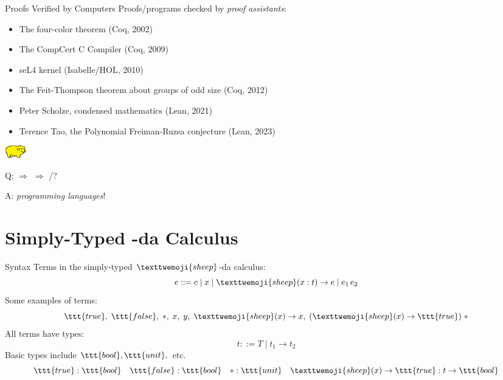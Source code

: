 \documentclass{beamer}
\newcommand{\lamb}{\texttwemoji{sheep}}
\begin{document}
\begin{frame}{Proofs Verified by Computers}
 \small{Proofs/programs checked by \emph{proof assistants}:}
 \pause
 \begin{itemize}
   \item The four-color theorem (Coq, 2002) 
   \item The CompCert C Compiler (Coq, 2009)
   \item seL4 kernel (Isabelle/HOL, 2010)
   \item The Feit-Thompson theorem about groups of odd
     size (Coq, 2012) \pause 
   \item Peter Scholze, condensed mathematics (Lean, 2021)
   \item Terence Tao, the Polynomial Freiman-Ruzsa conjecture (Lean, 2023)
 \end{itemize}
\end{frame}

\begin{frame}{\includegraphics[width=26pt]{yellowPig.png}}
  \begin{center}
    \Huge{Q:  $\Rightarrow$  $\Rightarrow$ /?}
\pause 
\vspace{1em}

    \huge{A: \emph{programming
    languages}!}
  \end{center}
\end{frame}


\section{Simply-Typed \texorpdfstring{\lamb}{lamb}-da Calculus}

\begin{frame}{Syntax}
Terms in the simply-typed $\lamb$-da calculus:
\[
  e ::= c \mid x \mid \lamb(x:t) \to e \mid e_1 \, e_2 
\] 
Some examples of terms: 
\[
  \ttt{true},\; \ttt{false},\; *, \; x,\; y,\; \lamb(x) \to x, \; (\lamb(x) \to
  \ttt{true}) \; *
\]
\pause
All terms have types:
\[
  t ::= T \mid t_1 \to t_2
\]
Basic types include $\ttt{bool}, \ttt{unit},$ etc. 
\[
  \ttt{true} : \ttt{bool} \quad \ttt{false} : \ttt{bool} \quad * : \ttt{unit}
  \quad \lamb(x) \to \ttt{true} : t \to \ttt{bool}
\] 


\end{frame}
\end{document}
